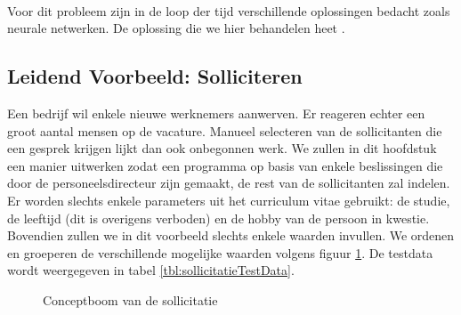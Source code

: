 \paragraph{}
Voor dit probleem zijn in de loop der tijd verschillende oplossingen bedacht zoals neurale netwerken. De oplossing die we hier behandelen heet .
\subsection{Leidend Voorbeeld: Solliciteren}
\begin{leftbar}
Een bedrijf wil enkele nieuwe werknemers aanwerven. Er reageren echter een groot aantal mensen op de vacature. Manueel selecteren van de sollicitanten die een gesprek krijgen lijkt dan ook onbegonnen werk. We zullen in dit hoofdstuk een manier uitwerken zodat een programma op basis van enkele beslissingen die door de personeelsdirecteur zijn gemaakt, de rest van de sollicitanten zal indelen. Er worden slechts enkele parameters uit het curriculum vitae gebruikt: de studie, de leeftijd (dit is overigens verboden) en de hobby van de persoon in kwestie. Bovendien zullen we in dit voorbeeld slechts enkele waarden invullen. We ordenen en groeperen de verschillende mogelijke waarden volgens figuur \ref{fig:sollicitatieConceptTree}. De testdata wordt weergegeven in tabel \ref{tbl:sollicitatieTestData}.
\end{leftbar}
\begin{figure}[htb]
\centering
{}
\caption{Conceptboom van de sollicitatie}
\label{fig:sollicitatieConceptTree}
\end{figure}
